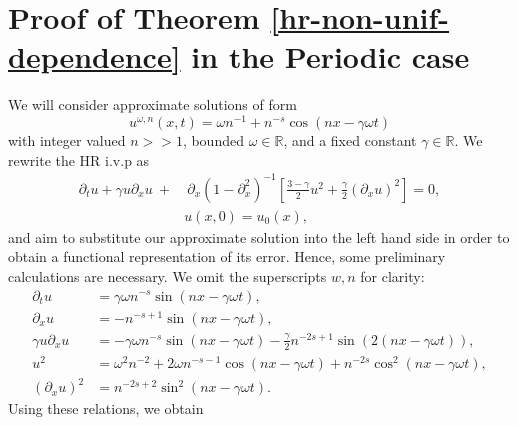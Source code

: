 \documentclass[12pt,reqno]{amsart}
\newcommand{\rr}{\mathbb{R}}
\newcommand{\p}{\partial}
\theoremstyle{plain}  %
\theoremstyle{definition}
\begin{document}
	\section{Proof of Theorem \ref{hr-non-unif-dependence}
 in the Periodic case} 
	\setcounter{equation}{0}
	We will consider approximate solutions of form
	\begin{equation}
		\label{approx-solutions-form}
		u^{\omega,n}(x,t) = \omega n^{-1} + n^{-s} \cos \left( nx - \gamma \omega t
		\right) 
	\end{equation}
	with integer valued $n >>1$, bounded $\omega \in \rr$, and a fixed constant $\gamma \in \rr$. We rewrite 
	the HR i.v.p as
	\begin{align}
			 \p_t u + \gamma u \p_x u \ + & \ \p_x (1 - \p_x^2)^{-1} 
			 \left[ \frac{3 - \gamma}{2}u^2 +
			\frac{\gamma}{2}(\p_x u)^2 \right] = 0,
			\label{hyperelastic-rod-equation}
			\\
			& {u(x,0) = u_0(x)},
			\label{init-cond}
			\end{align}
	and aim to substitute our approximate solution into the left hand side 
	in order to obtain a functional representation of its error. Hence, some 
	preliminary calculations are necessary. We omit the superscripts $w,n$ for clarity: 
	\begin{equation}
		\begin{split}
			 \p_t u
			 & = \gamma \omega n^{-s} \sin\left( nx - \gamma \omega t \right),
			\\
			 \p_x u
			 & = -n^{-s+1} \sin(nx - \gamma \omega t),
			\\
			\gamma u \p_x u
			& = - \gamma \omega n^{-s} \sin\left( nx - \gamma
			\omega t \right) - \frac{\gamma}{2}n^{-2s+1}\sin\left( 2\left( nx - \gamma
			\omega t
			\right) \right),
			\\
			u^2 
			& = \omega^2 n^{-2} + 2\omega n^{-s -1} \cos \left( nx - \gamma \omega t
			\right) + n^{-2s} \cos^2\left( nx - \gamma \omega t \right),
			\\
			(\p_x u)^2 
			& = n^{-2s+2} \sin^2\left( nx - \gamma \omega t \right).
			\label{calculation of functional representation of error}
		\end{split}
	\end{equation}
	Using these relations, we obtain
\end{document}
